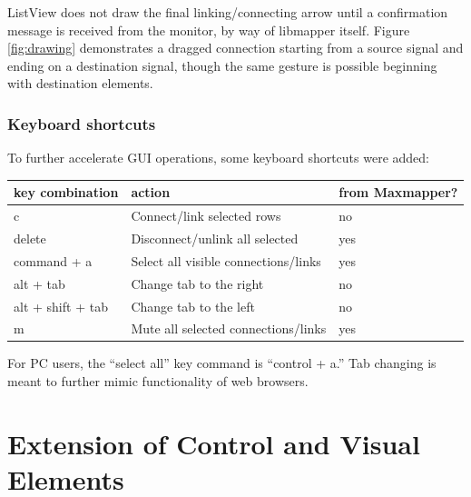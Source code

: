 ListView does not draw the final linking/connecting arrow until a confirmation message is received from the monitor, by way of libmapper itself. Figure \ref{fig:drawing} demonstrates a dragged connection starting from a source signal and ending on a destination signal, though the same gesture is possible beginning with destination elements.


		\subsubsection{Keyboard shortcuts}

To further accelerate GUI operations, some keyboard shortcuts were added:

\begin{table}[!h]
	\centering
	\label{tab:list_view_shortcut_keys}
		\begin{tabular}{l  l  l}
		\hline\hline
		key combination&action&from Maxmapper?\\
		\hline
		c 					& Connect/link selected rows & no\\
		delete 				& Disconnect/unlink all selected & yes\\
		command + a 		& Select all visible connections/links & yes\\
		alt + tab 			& Change tab to the right & no\\
		alt + shift + tab 	& Change tab to the left & no\\ 
		m 					& Mute all selected connections/links & yes\\
		\end{tabular}
\end{table}

For PC users, the ``select all'' key command is ``control + a.'' Tab changing is meant to further mimic functionality of web browsers. 



\section{Extension of Control and Visual Elements} %
\label{sec:extension_of_control_and_visual_elements}

